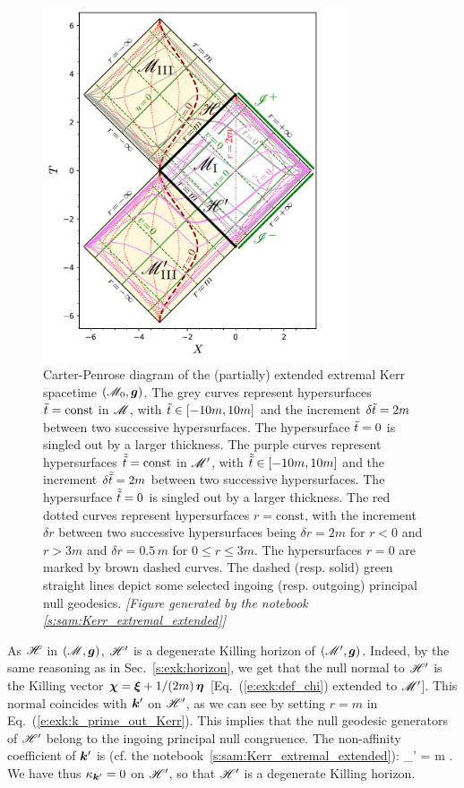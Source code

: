 \begin{figure}
\centerline{\includegraphics[width=0.8\textwidth]{exk_CPdiag_M0.pdf}}
\caption[]{\label{f:exk:CPdiag_M0} \footnotesize
Carter-Penrose diagram of the (partially) extended extremal Kerr spacetime $(\mathscr{M}_0,\bm{g})$.
The grey curves represent hypersurfaces ${\tilde t}=\mathrm{const}$ in $\mathscr{M}$, with
${\tilde t}\in[-10 m, 10 m]$ and
the increment $\delta{\tilde t} = 2 m$ between two successive hypersurfaces.
The hypersurface ${\tilde t}=0$ is singled out by a larger thickness.
The purple curves represent hypersurfaces $\tilde{{\tilde t}}=\mathrm{const}$ in $\mathscr{M}'$, with
$\tilde{{\tilde t}}\in[-10 m, 10 m]$ and
the increment $\delta\tilde{{\tilde t}} = 2 m$ between two successive hypersurfaces.
The hypersurface $\tilde{{\tilde t}}=0$ is singled out by a larger thickness.
The red dotted curves represent hypersurfaces $r=\mathrm{const}$,
with the increment $\delta r$ between two successive hypersurfaces being
$\delta r = 2m$ for $r<0$ and $r> 3m$ and $\delta r = 0.5\, m$ for $0\leq r \leq 3m$.
The hypersurfaces $r=0$ are marked by brown dashed curves.
The dashed (resp. solid) green straight lines depict some selected ingoing (resp. outgoing)
principal null geodesics.
\textsl{[Figure generated by the notebook \ref{s:sam:Kerr_extremal_extended}]}
}
\end{figure}

As $\mathscr{H}$ in $(\mathscr{M},\bm{g})$, $\mathscr{H}'$ is a degenerate Killing horizon of $(\mathscr{M}',\bm{g})$.
Indeed, by the same reasoning as in Sec.~\ref{s:exk:horizon}, we get that
the null normal to $\mathscr{H}'$ is the Killing vector
$\bm{\chi} = \bm{\xi} + 1/(2m) \, \bm{\eta}$ [Eq.~(\ref{e:exk:def_chi}) extended to
$\mathscr{M}'$]. This normal coincides with $\bm{k}'$ on $\mathscr{H}'$, as we can see
by setting $r=m$ in  Eq.~(\ref{e:exk:k_prime_out_Kerr}). This implies that
the null geodesic generators of  $\mathscr{H}'$ belong to the ingoing principal null congruence.
The non-affinity coefficient of $\bm{k}'$ is (cf. the notebook~\ref{s:sam:Kerr_extremal_extended}):
\be
    \kappa_{'} = m  .
\ee
We have thus $\kappa_{\bm{k}'} = 0$ on $\mathscr{H}'$, so that $\mathscr{H}'$ is a
degenerate Killing horizon.

